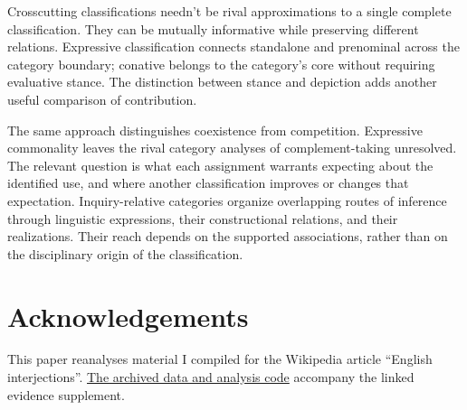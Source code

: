 \documentclass[12pt]{article}
\newif\ifblind
\begin{document}
Crosscutting classifications needn't be rival approximations to a single
complete classification. They can be mutually informative while preserving
different relations. Expressive classification connects standalone and
prenominal  across the category boundary; conative
 belongs to the category's core without requiring evaluative
stance. The distinction between stance and depiction adds another
useful comparison of contribution.

The same approach distinguishes coexistence from competition. Expressive
commonality leaves the rival category analyses of complement-taking
 unresolved. The relevant
question is what each assignment warrants expecting about the identified
use, and where another classification improves or changes that expectation.
Inquiry-relative categories organize overlapping routes of inference through
linguistic expressions, their constructional relations, and their realizations.
Their reach depends on the supported
associations, rather than on the disciplinary origin of the classification.

\ifblind\else
\section*{Acknowledgements}

This paper reanalyses material I compiled for the Wikipedia article
\enquote{English interjections}.
\href{https://github.com/BrettRey/interjections-hpc/tree/master}{The archived
data and analysis code} accompany the linked evidence supplement.
\fi

\clearpage
\begingroup
\setlength{\emergencystretch}{3em}
\printbibliography
\endgroup
\end{document}
